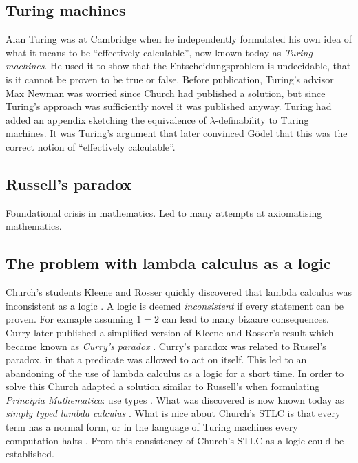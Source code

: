 \subsection{Turing machines}

Alan Turing was at Cambridge when he independently formulated his own idea of what it means to be ``effectively calculable'', now known today as \emph{Turing machines}. He used it to show that the Entscheidungsproblem is undecidable, that is it cannot be proven to be true or false. Before publication, Turing's advisor Max Newman was worried since Church had published a solution, but since Turing's approach was sufficiently novel it was published anyway. Turing had added an appendix sketching the equivalence of $\lambda$-definability to Turing machines. It was Turing's argument that later convinced G\"odel that this was the correct notion of ``effectively calculable''.

\subsection{Russell's paradox}

Foundational crisis in mathematics.
Led to many attempts at axiomatising mathematics.


\subsection{The problem with lambda calculus as a logic}

Church's students Kleene and Rosser quickly discovered that lambda calculus was inconsistent as a logic \cite{kleene1935c}.
A logic is deemed \emph{inconsistent} if every statement can be proven. For exmaple assuming $1 = 2$ can lead to many bizaare consequences.
Curry later published a simplified version of Kleene and Rosser's result which became known as \emph{Curry's paradox} \cite{curry1942}. Curry's paradox was related to Russel's paradox, in that a predicate was allowed to act on itself. This led to an abandoning of the use of lambda calculus as a logic for a short time. In order to solve this Church adapted a solution similar to Russell's when formulating \emph{Principia Mathematica}: use types \cite{PrincipiaMathematicaVolumeI}. What was discovered is now known today as \emph{simply typed lambda calculus} \cite{church1940}. What is nice about Church's STLC is that every term has a normal form, or in the language of Turing machines every computation halts \cite{turing1936}. From this consistency of Church's STLC as a logic could be established.


